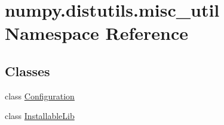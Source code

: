 \hypertarget{namespacenumpy_1_1distutils_1_1misc__util}{}\section{numpy.\+distutils.\+misc\+\_\+util Namespace Reference}
\label{namespacenumpy_1_1distutils_1_1misc__util}
\subsection*{Classes}
\begin{DoxyCompactItemize}
\item 
class \hyperlink{classnumpy_1_1distutils_1_1misc__util_1_1Configuration}{Configuration}
\item 
class \hyperlink{classnumpy_1_1distutils_1_1misc__util_1_1InstallableLib}{Installable\+Lib}
\end{DoxyCompactItemize}
